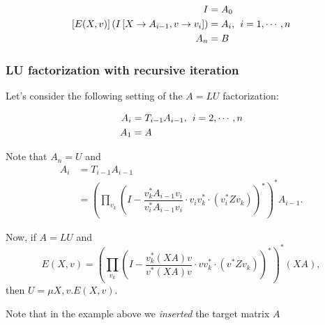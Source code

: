 \begin{align*}
I &= A_0 \\
\left[E(X, v)\right](I\left[X\rightarrow A_{i-1}, v\rightarrow v_{i}\right])&=A_i,\hspace{1ex}i=1,\cdots, n \\
A_n &= B
\end{align*}

\subsubsection*{LU factorization with recursive iteration}
Let's consider the following setting of the $A=LU$ factorization:

\begin{align*}
A_i&=T_{i-1}A_{i-1},\hspace{1ex}i=2, \cdots, n \\
A_1&=A \\
\end{align*}

Note that $A_n=U$ and 
\begin{align*}
A_i&=T_{i-1}A_{i-1} \\
&=\left(\prod_{v_k}\left(I-\dfrac{v_k^*A_{i-1}v_i}{v_i^*A_{i-1}v_i}\cdot v_iv_k^*\cdot\left(v_i^*Zv_k\right)\right)^*\right)^*A_{i-1}.
\end{align*}

Now, if $A=LU$ and $$E(X, v)=\left(\prod_{v_k}\left(I-\dfrac{v_k^*(XA)v}{v^*(XA)v}\cdot vv_k^*\cdot\left(v^*Zv_k\right)\right)^*\right)^*(XA),$$
then $U=\mu X, v.E(X,v)$.

Note that in the example above we \textit{inserted} the target matrix $A$

